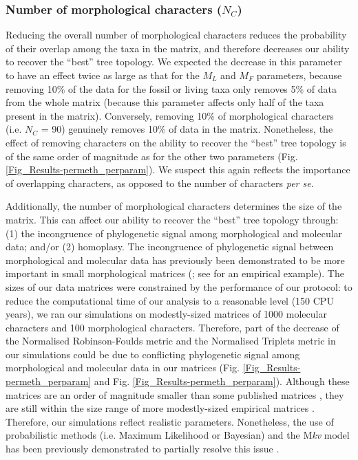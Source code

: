 \subsubsection*{Number of morphological characters ($N_{C}$)}
Reducing the overall number of morphological characters reduces the probability of their overlap among the taxa in the matrix, and therefore decreases our ability to recover the ``best'' tree topology.
We expected the decrease in this parameter to have an effect twice as large as that for the $M_{L}$ and $M_{F}$ parameters, because removing 10\% of the data for the fossil or living taxa only removes 5\% of data from the whole matrix (because this parameter affects only half of the taxa present in the matrix).
Conversely, removing 10\% of morphological characters (i.e. $N_{C}$ = 90) genuinely removes 10\% of data in the matrix.
Nonetheless, the effect of removing characters on the ability to recover the ``best'' tree topology is of the same order of magnitude as for the other two parameters (Fig. \ref{Fig_Results-permeth_perparam}).
We suspect this again reflects the importance of overlapping characters, as opposed to the number of characters \textit{per se}.

Additionally, the number of morphological characters determines the size of the matrix.
This can affect our ability to recover the ``best'' tree topology through: (1) the incongruence of phylogenetic signal among morphological and molecular data; and/or (2) homoplasy.
The incongruence of phylogenetic signal between morphological and molecular data has previously been demonstrated to be more important in small morphological matrices (\citealt{bremer1992phylogeny,patterson1993congruence}; see \citealt{masters2002lack} for an empirical example).
The sizes of our data matrices were constrained by the performance of our protocol: to reduce the computational time of our analysis to a reasonable level (150 CPU years), we ran our simulations on modestly-sized matrices of 1000 molecular characters and 100 morphological characters.
Therefore, part of the decrease of the Normalised Robinson-Foulds metric and the Normalised Triplets metric in our simulations could be due to conflicting phylogenetic signal among morphological and molecular data in our matrices (Fig. \ref{Fig_Results-permeth_perparam} and Fig. \ref{Fig_Results-permeth_perparam}).
Although these matrices are an order of magnitude smaller than some published matrices \citep[e.g.][]{springermacroevolutionary2012,ni2013oldest}, they are still within the size range of more modestly-sized empirical matrices \citep[e.g.][]{kellymolecular2014, sallam2011craniodental}.
Therefore, our simulations reflect realistic parameters.
Nonetheless, the use of probabilistic methods (i.e. Maximum Likelihood or Bayesian) and the M\textit{kv} model \citep{lewisa2001} has been previously demonstrated to partially resolve this issue \citep{wrightbayesian2014}.

